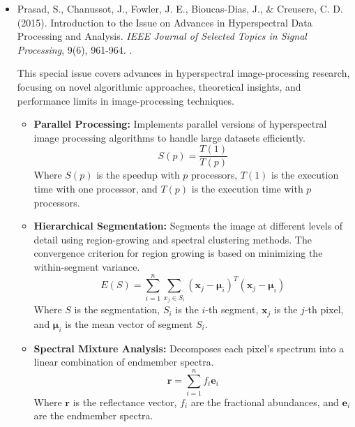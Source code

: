 \documentclass[10pt,svgnames,fragile]{beamer}
\begin{document}
\begin{frame}{}
\tiny
\begin{itemize}

    \item Prasad, S., Chanussot, J., Fowler, J. E., Bioucas-Dias, J., & Creusere, C. D. (2015). Introduction to the Issue on Advances in Hyperspectral Data Processing and Analysis. \textit{IEEE Journal of Selected Topics in Signal Processing}, 9(6), 961-964. \href{https://doi.org/10.1109/JSTSP.2015.2457631}{\color{blue}{DOI: 10.1109/JSTSP.2015.2457631}}.
    \cite{prasadIntroductionIssueAdvances2015}
    
    {\color{gray}This special issue covers advances in hyperspectral image-processing research, focusing on novel algorithmic approaches, theoretical insights, and performance limits in image-processing techniques.}
    \begin{itemize} \tiny
    \item \textbf{Parallel Processing:} Implements parallel versions of hyperspectral image processing algorithms to handle large datasets efficiently.
    \[
    S(p) = \frac{T(1)}{T(p)}
    \]
    Where \( S(p) \) is the speedup with \( p \) processors, \( T(1) \) is the execution time with one processor, and \( T(p) \) is the execution time with \( p \) processors.
    \item \textbf{Hierarchical Segmentation:} Segments the image at different levels of detail using region-growing and spectral clustering methods. The convergence criterion for region growing is based on minimizing the within-segment variance.
    \[
    E(S) = \sum_{i=1}^{n} \sum_{x_j \in S_i} (\mathbf{x}_j - \boldsymbol{\mu}_i)^T (\mathbf{x}_j - \boldsymbol{\mu}_i)
    \]
    Where \( S \) is the segmentation, \( S_i \) is the \( i \)-th segment, \( \mathbf{x}_j \) is the \( j \)-th pixel, and \( \boldsymbol{\mu}_i \) is the mean vector of segment \( S_i \).
    \item \textbf{Spectral Mixture Analysis:} Decomposes each pixel's spectrum into a linear combination of endmember spectra.
    \[
    \mathbf{r} = \sum_{i=1}^{n} f_i \mathbf{e}_i
    \]
    Where \( \mathbf{r} \) is the reflectance vector, \( f_i \) are the fractional abundances, and \( \mathbf{e}_i \) are the endmember spectra.
\end{itemize}
    
\end{itemize}
\end{frame}
\end{document}
